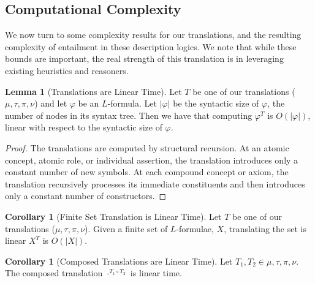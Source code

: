 \documentclass[letterpaper]{article} %
\theoremstyle{definition}
\newtheorem{lemma}{Lemma}
\theoremstyle{definition}
\theoremstyle{definition}
\theoremstyle{definition}
\theoremstyle{definition}
\newtheorem{corollary}[theorem]{Corollary}
\begin{document}
\subsection{Computational Complexity}
We now turn to some complexity results for our translations, and the resulting complexity of entailment in these description logics. We note that while these bounds are important, the real strength of this translation is in leveraging existing heuristics and reasoners.
\begin{lemma}[Translations are Linear Time]\label{lem:t-linear}
Let $T$ be one of our translations ($\mu,\tau,\pi,\nu$) and let $\varphi$ be an $L$-formula. Let $|\varphi|$ be the syntactic size of $\varphi$, the number of nodes in its syntax tree. Then we have that computing $\varphi^T$ is $O(|\varphi|)$, linear with respect to the syntactic size of $\varphi$.
\end{lemma}
\begin{proof}
The translations are computed by structural recursion. At an atomic concept, atomic role, or individual assertion, the translation introduces only a constant number of new symbols. At each compound concept or axiom, the translation recursively processes its immediate constituents and then introduces only a constant number of  constructors.
\end{proof}
\begin{corollary}[Finite Set Translation is Linear Time]\label{cor:Finset-Lin} 
    Let $T$ be one of our translations ($\mu,\tau,\pi,\nu$). Given a finite set of $L$-formulae, $X$, translating the set is linear $X^T$ is $O(|X|)$. 
\end{corollary}
\begin{corollary}[Composed Translations are Linear Time]\label{cor:Comp-Lin} 
    Let $T_1,T_2 \in {\mu,\tau,\pi,\nu}$. The composed translation $\cdot^{T_1 \circ T_2}$ is linear time.
\end{corollary}
\end{document}
